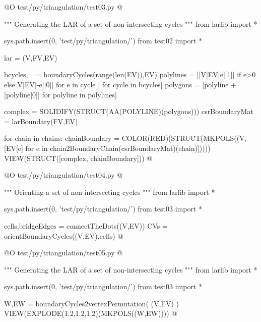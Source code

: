 \documentclass[11pt,oneside]{article}    %
\begin{document}
@O test/py/triangulation/test03.py
@{""" Generating the LAR of a set of non-intersecting cycles """
from larlib import *

sys.path.insert(0, 'test/py/triangulation/')
from test02 import *

lar = (V,FV,EV)

bcycles,_ = boundaryCycles(range(len(EV)),EV)
polylines = [[V[EV[e][1]] if e>0 else V[EV[-e][0]] for e in cycle ] for cycle in bcycles]
polygons = [polyline + [polyline[0]] for polyline in polylines]

complex = SOLIDIFY(STRUCT(AA(POLYLINE)(polygons)))
csrBoundaryMat = larBoundary(FV,EV)

for chain in chains:
    chainBoundary = COLOR(RED)(STRUCT(MKPOLS((V,[EV[e] 
                        for e in chain2BoundaryChain(csrBoundaryMat)(chain)]))))
    VIEW(STRUCT([complex, chainBoundary]))
@}

@O test/py/triangulation/test04.py
@{""" Orienting a set of non-intersecting cycles """
from larlib import *

sys.path.insert(0, 'test/py/triangulation/')
from test03 import *

cells,bridgeEdges = connectTheDots((V,EV))
CVs = orientBoundaryCycles((V,EV),cells)
@}

@O test/py/triangulation/test05.py
@{""" Generating the LAR of a set of non-intersecting cycles """
from larlib import *

sys.path.insert(0, 'test/py/triangulation/')
from test03 import *

W,EW = boundaryCycles2vertexPermutation( (V,EV) )
VIEW(EXPLODE(1.2,1.2,1.2)(MKPOLS((W,EW))))
@}
\end{document}
